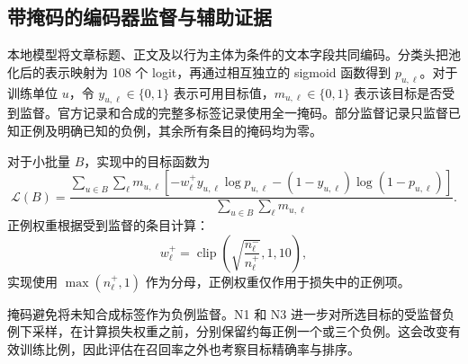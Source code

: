 \documentclass[12pt,a4paper]{article}
\begin{document}
\subsection{带掩码的编码器监督与辅助证据}
本地模型将文章标题、正文及以行为主体为条件的文本字段共同编码。分类头把池化后的表示映射为 108 个 logit，再通过相互独立的 sigmoid 函数得到 $p_{u,\ell}$。对于训练单位 $u$，令 $y_{u,\ell}\in\{0,1\}$ 表示可用目标值，$m_{u,\ell}\in\{0,1\}$ 表示该目标是否受到监督。官方记录和合成的完整多标签记录使用全一掩码。部分监督记录只监督已知正例及明确已知的负例，其余所有条目的掩码均为零。

对于小批量 $B$，实现中的目标函数为
\begin{equation}
\mathcal{L}(B)=\frac{\sum_{u\in B}\sum_{\ell}m_{u,\ell}
\left[-w^+_\ell y_{u,\ell}\log p_{u,\ell}
-(1-y_{u,\ell})\log(1-p_{u,\ell})\right]}
{\sum_{u\in B}\sum_{\ell}m_{u,\ell}}.
\label{eq:maskedloss}
\end{equation}
正例权重根据受到监督的条目计算：
\begin{equation}
w^+_\ell=\operatorname{clip}\!\left(\sqrt{\frac{n^-_\ell}{n^+_\ell}},1,10\right),
\label{eq:weights}
\end{equation}
实现使用 $\max(n^+_\ell,1)$ 作为分母，正例权重仅作用于损失中的正例项。

掩码避免将未知合成标签作为负例监督。N1 和 N3 进一步对所选目标的受监督负例下采样，在计算损失权重之前，分别保留约每正例一个或三个负例。这会改变有效训练比例，因此评估在召回率之外也考察目标精确率与排序。
\end{document}

